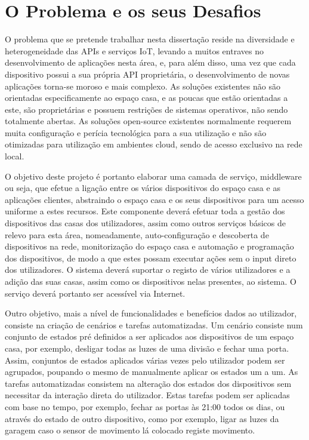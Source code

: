 \chapter{O Problema e os seus Desafios}

O problema que se pretende trabalhar nesta dissertação reside na diversidade e heterogeneidade das APIs e serviços IoT, levando a muitos entraves no desenvolvimento de aplicações nesta área, e, para além disso, uma vez que cada dispositivo possui a sua própria API proprietária, o desenvolvimento de novas aplicações torna-se moroso e mais complexo. As soluções existentes não são orientadas especificamente ao espaço casa, e as poucas que estão orientadas a este, são proprietárias e possuem restrições de sistemas operativos, não sendo totalmente abertas.  As soluções open-source existentes normalmente requerem muita configuração e perícia tecnológica para a sua utilização e não são otimizadas para utilização em ambientes cloud, sendo de acesso exclusivo na rede local.

O objetivo deste projeto é portanto elaborar uma camada de serviço, middleware ou seja, que efetue a ligação entre os vários dispositivos do espaço casa e as aplicações clientes, abstraindo o espaço casa e os seus dispositivos para um acesso uniforme a estes recursos. Este componente deverá efetuar toda a gestão dos dispositivos das casas dos utilizadores, assim como outros serviços básicos de relevo para esta área, nomeadamente, auto-configuração e descoberta de dispositivos na rede, monitorização do espaço casa e automação e programação dos dispositivos, de modo a que estes possam executar ações sem o input direto dos utilizadores. O sistema deverá suportar o registo de vários utilizadores e a adição das suas casas, assim como os dispositivos nelas presentes, ao sistema. O serviço deverá portanto ser acessível via Internet.

Outro objetivo, mais a nível de funcionalidades e benefícios dados ao utilizador, consiste na criação de cenários e tarefas automatizadas. Um cenário consiste num conjunto de estados pré definidos a ser aplicados aos dispositivos de um espaço casa, por exemplo, desligar todas as luzes de uma divisão e fechar uma porta. Assim, conjuntos de estados aplicados várias vezes pelo utilizador podem ser agrupados, poupando o mesmo de manualmente aplicar os estados um a um. As tarefas automatizadas consistem na alteração dos estados dos dispositivos sem necessitar da interação direta do utilizador. Estas tarefas podem ser aplicadas com base no tempo, por exemplo, fechar as portas às 21:00 todos os dias, ou através do estado de outro dispositivo, como por exemplo, ligar as luzes da garagem caso o sensor de movimento lá colocado registe movimento.

